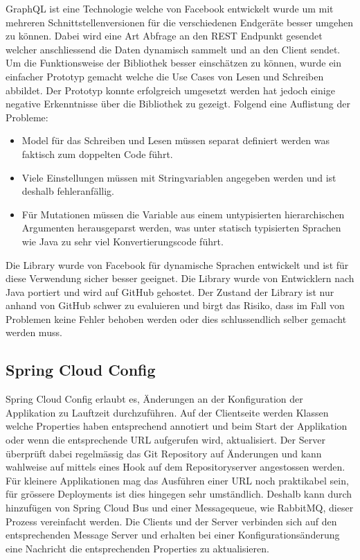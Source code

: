 GraphQL ist eine Technologie welche von Facebook entwickelt wurde um mit mehreren Schnittstellenversionen für die verschiedenen Endgeräte besser umgehen zu können. Dabei wird eine Art Abfrage an den \gls{REST} Endpunkt gesendet welcher anschliessend die Daten dynamisch sammelt und an den Client sendet. Um die Funktionsweise der Bibliothek besser einschätzen zu können, wurde ein einfacher Prototyp gemacht welche die Use Cases von Lesen und Schreiben abbildet.\newline
Der Prototyp konnte erfolgreich umgesetzt werden hat jedoch einige negative Erkenntnisse über die Bibliothek zu gezeigt. Folgend eine Auflistung der Probleme:\newline
\begin{itemize}
	\item Model für das Schreiben und Lesen müssen separat definiert werden was faktisch zum doppelten Code führt.
	\item Viele Einstellungen müssen mit Stringvariablen angegeben werden und ist deshalb fehleranfällig.
	\item Für Mutationen müssen die Variable aus einem untypisierten hierarchischen Argumenten herausgeparst werden, was unter statisch typisierten Sprachen wie Java zu sehr viel Konvertierungscode führt.
\end{itemize}
Die Library wurde von Facebook für dynamische Sprachen entwickelt und ist für diese Verwendung sicher besser geeignet. Die Library wurde von Entwicklern nach Java portiert und wird auf GitHub gehostet. Der Zustand der Library ist nur anhand von GitHub schwer zu evaluieren und birgt das Risiko, dass im Fall von Problemen keine Fehler behoben werden oder dies schlussendlich selber gemacht werden muss.

\subsection{Spring Cloud Config}

Spring Cloud Config erlaubt es, Änderungen an der Konfiguration der Applikation zu Lauftzeit durchzuführen. Auf der Clientseite werden Klassen welche Properties haben entsprechend annotiert und beim Start der Applikation oder wenn die entsprechende URL aufgerufen wird, aktualisiert. Der Server überprüft dabei regelmässig das Git Repository auf Änderungen und kann wahlweise auf mittels eines Hook auf dem Repositoryserver angestossen werden. Für kleinere Applikationen mag das Ausführen einer URL noch praktikabel sein, für grössere Deployments ist dies hingegen sehr umständlich. Deshalb kann durch hinzufügen von Spring Cloud Bus und einer Messagequeue, wie RabbitMQ, dieser Prozess vereinfacht werden. Die Clients und der Server verbinden sich auf den entsprechenden Message Server und erhalten bei einer Konfigurationsänderung eine Nachricht die entsprechenden Properties zu aktualisieren.

